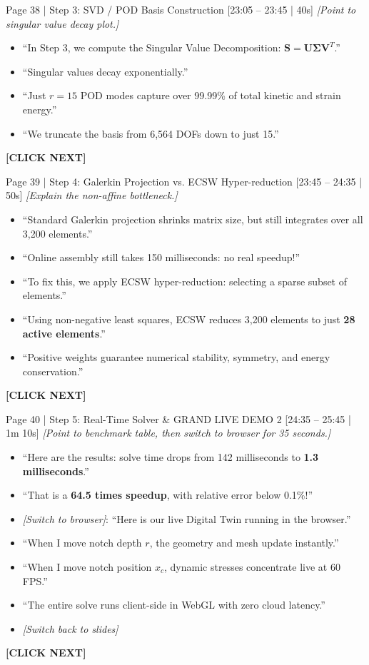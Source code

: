 \documentclass[9pt,a4paper]{article}
\begin{document}
\begin{slidebox}{Page 38 | Step 3: SVD / POD Basis Construction \hfill [23:05 -- 23:45 | 40s]}
\textit{[Point to singular value decay plot.]}
\begin{itemize}
  \item ``In Step 3, we compute the Singular Value Decomposition: $\mathbf{S} = \mathbf{U} \boldsymbol{\Sigma} \mathbf{V}^T$.''
  \item ``Singular values decay exponentially.''
  \item ``Just $r = 15$ POD modes capture over 99.99\% of total kinetic and strain energy.''
  \item ``We truncate the basis from 6,564 DOFs down to just 15.''
\end{itemize}
\textbf{\color{cnamred}[CLICK NEXT]}
\end{slidebox}

\begin{slidebox}{Page 39 | Step 4: Galerkin Projection vs. ECSW Hyper-reduction \hfill [23:45 -- 24:35 | 50s]}
\textit{[Explain the non-affine bottleneck.]}
\begin{itemize}
  \item ``Standard Galerkin projection shrinks matrix size, but still integrates over all 3,200 elements.''
  \item ``Online assembly still takes 150 milliseconds: no real speedup!''
  \item ``To fix this, we apply ECSW hyper-reduction: selecting a sparse subset of elements.''
  \item ``Using non-negative least squares, ECSW reduces 3,200 elements to just \textbf{28 active elements}.''
  \item ``Positive weights guarantee numerical stability, symmetry, and energy conservation.''
\end{itemize}
\textbf{\color{cnamred}[CLICK NEXT]}
\end{slidebox}

\begin{slidebox}{Page 40 | Step 5: Real-Time Solver \& GRAND LIVE DEMO 2 \hfill [24:35 -- 25:45 | 1m 10s]}
\textit{[Point to benchmark table, then switch to browser for 35 seconds.]}
\begin{itemize}
  \item ``Here are the results: solve time drops from 142 milliseconds to \textbf{1.3 milliseconds}.''
  \item ``That is a \textbf{64.5 times speedup}, with relative error below 0.1\%!''
  \item \textit{[Switch to browser]}: ``Here is our live Digital Twin running in the browser.''
  \item ``When I move notch depth $r$, the geometry and mesh update instantly.''
  \item ``When I move notch position $x_c$, dynamic stresses concentrate live at 60 FPS.''
  \item ``The entire solve runs client-side in WebGL with zero cloud latency.''
  \item \textit{[Switch back to slides]}
\end{itemize}
\textbf{\color{cnamred}[CLICK NEXT]}
\end{slidebox}
\end{document}
